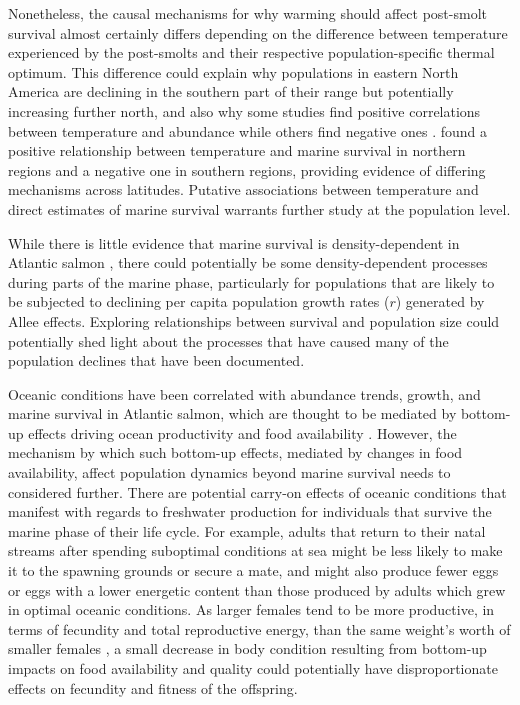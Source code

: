 \documentclass[12pt]{article}
\begin{document}
Nonetheless, the causal mechanisms for why warming should affect post-smolt
survival almost certainly differs depending on the difference between
temperature experienced by the post-smolts and their respective
population-specific thermal optimum. 
This difference could explain why populations in eastern North America are
declining in the southern part of their range but potentially increasing
further north, and also why some studies find positive correlations between
temperature and abundance \citep{Friedland1998, Friedland1998b, Jonsson2004}
while others find negative ones \citep{Friedland1993, Todd2008}.
\citet{Olmos2020} found a positive relationship between temperature and marine survival 
in northern regions and a negative one in southern regions, providing 
evidence of differing mechanisms across latitudes.
Putative associations between temperature and direct estimates of marine
survival warrants further study at the population level.

While there is little evidence that marine survival is density-dependent in
Atlantic salmon \citep{Jonsson1998,Gibson2006}, there could potentially be
some density-dependent processes during parts of the marine phase, 
particularly for populations that are likely to be subjected to
declining per capita population growth rates ($r$) generated by Allee effects.
Exploring relationships between survival and population size could potentially
shed light about the processes that have caused many of the population
declines that have been documented.

Oceanic conditions have been correlated with abundance trends, growth, and marine survival
in Atlantic salmon, which are thought
to be mediated by bottom-up effects driving ocean productivity and food availability
 \citep{Todd2008, Renkawitz2015,Olmos2020}. 
However, the mechanism by which such bottom-up effects,
mediated by changes in food availability,
affect population dynamics beyond marine survival needs to
considered further. 
There are potential carry-on effects of oceanic
conditions that manifest with regards to freshwater production for individuals that survive
the marine phase of their life cycle. 
For example, adults
that return to their natal streams after spending suboptimal conditions at sea might be less
likely to make it to the spawning grounds or secure a mate, and might also
produce fewer eggs or eggs with a lower energetic content than those
produced by adults which grew in optimal oceanic conditions.
As larger females tend to be more productive, in terms of fecundity and total
reproductive energy, than the same weight's worth of smaller females
\citep{Barneche2018}, a small decrease in body condition resulting from bottom-up
impacts on food availability and quality could potentially have
disproportionate effects on fecundity and fitness of the offspring.
\end{document}
